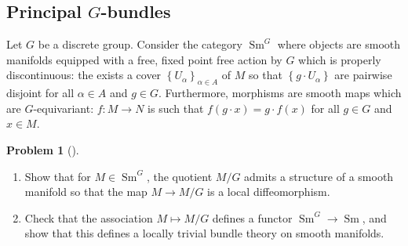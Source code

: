 \documentclass[reqno]{amsart}
\theoremstyle{definition}
\newtheorem{problem}[theorem]{Problem}
\theoremstyle{remark}
\DeclareMathOperator{\Sm}{Sm}
\begin{document}
    \subsection{Principal $G$-bundles}

    Let $G$ be a discrete group. Consider the category
    $\Sm^{G}$ where objects are smooth manifolds equipped with a
    free, fixed point free action by $G$ which is
    properly discontinuous: the exists a cover
    $\left\{ U_\alpha \right\}_{\alpha \in A}$ of $M$ so that
    $\left\{ g \cdot U_{\alpha} \right\} $ are pairwise
    disjoint for all $\alpha \in A$ and $g \in G$.
    Furthermore, morphisms are smooth maps
    which are $G$-equivariant: 
    $f \colon M \to N$ is such that
    $f \left( g \cdot  x \right) = g\cdot f(x)$ for all
    $g \in G$ and $x \in M$.

    \begin{problem}[]
        \begin{enumerate}
            \item Show that for $M \in \Sm^{G}$, the quotient
                $M / G$ admits a structure of a smooth
                manifold so that the map
                $M \to M /G$ is a local diffeomorphism.
            \item Check that the association 
                $M \mapsto M / G$ defines a functor
                $\Sm^{G} \to \Sm$, and show that this defines
                a locally trivial bundle theory on smooth
                manifolds.
        \end{enumerate}
    \end{problem}
\end{document}
